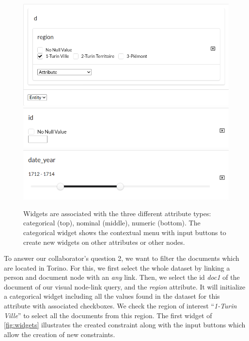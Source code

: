 \begin{figure}
    \centering
    \includegraphics[width=0.6\linewidth]{static/figures/ComBiNet/OriginalPaperFigures/constraintRegion.png}
    \includegraphics[width=0.6\linewidth]{static/figures/ComBiNet/OriginalPaperFigures/nominalWidget}
    \includegraphics[width=0.6\linewidth]{static/figures/ComBiNet/OriginalPaperFigures/numericWidget}


    \caption{Widgets are associated with the three different attribute types: categorical (top), nominal (middle), numeric (bottom). The categorical widget shows the contextual menu with input buttons to create new widgets on other attributes or other nodes.}\label{fig:widgets}
\end{figure}

To answer our collaborator's question 2, we want to filter the documents which are located in Torino. For this, we first select the whole dataset by linking a person and document node with an \textit{any} link. Then, we select the id \textit{doc1} of the document of our visual node-link query, and the \textit{region} attribute. It will initialize a categorical widget including all the values found in the dataset for this attribute with associated checkboxes. We check the region of interest ``\textit{1-Turin Ville}'' to select all the documents from this region. The first widget of \autoref{fig:widgets} illustrates the created constraint along with the input buttons which allow the creation of new constraints.



